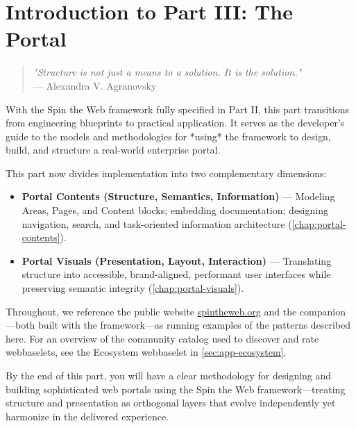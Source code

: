
\chapter*{Introduction to Part III: The Portal}
\label{part:implementation}

\begin{quote}
\textit{"Structure is not just a means to a solution. It is the solution."} \\
— Alexandra V. Agranovsky
\end{quote}

With the Spin the Web framework fully specified in Part II, this part transitions from engineering blueprints to practical application. It serves as the developer's guide to the models and methodologies for *using* the framework to design, build, and structure a real-world enterprise portal.

This part now divides implementation into two complementary dimensions:
\begin{itemize}
	\item \textbf{Portal Contents (Structure, Semantics, Information)} — Modeling Areas, Pages, and Content blocks; embedding documentation; designing navigation, search, and task-oriented information architecture (\cref{chap:portal-contents}).
	\item \textbf{Portal Visuals (Presentation, Layout, Interaction)} — Translating structure into accessible, brand-aligned, performant user interfaces while preserving semantic integrity (\cref{chap:portal-visuals}).
\end{itemize}

Throughout, we reference the public website \href{https://spintheweb.org}{spintheweb.org} and the companion \studio{}—both built with the framework—as running examples of the patterns described here. For an overview of the community catalog used to discover and rate webbaselets, see the Ecosystem webbaselet in \cref{sec:app-ecosystem}.

By the end of this part, you will have a clear methodology for designing and building sophisticated web portals using the Spin the Web framework—treating structure and presentation as orthogonal layers that evolve independently yet harmonize in the delivered experience.
